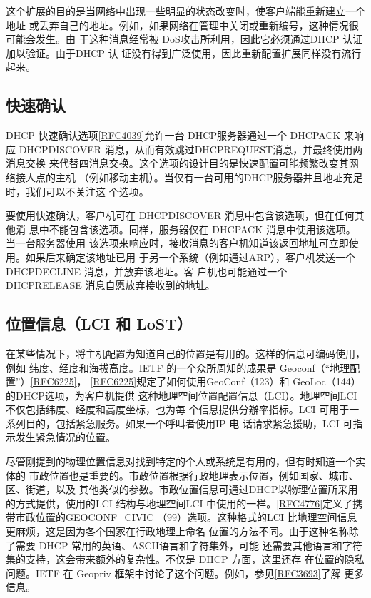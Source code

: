 这个扩展的目的是当网络中出现一些明显的状态改变时，使客户端能重新建立一个地址
或丢弃自己的地址。例如，如果网络在管理中关闭或重新编号，这种情况很可能会发生。由
于这种消息经常被 DoS攻击所利用，因此它必须通过DHCP 认证加以验证。由于DHCP 认
证没有得到广泛使用，因此重新配置扩展同样没有流行起来。

\subsection{快速确认}
DHCP
快速确认选项\href{https://www.rfc-editor.org/rfc/rfc4039}{\href{https://www.rfc-editor.org/rfc/rfc4039}{[RFC4039]}}允许一台
DHCP服务器通过一个 DHCPACK 来响应
DHCPDISCOVER 消息，从而有效跳过DHCPREQUEST消息，并最终使用两消息交换
来代替四消息交换。这个选项的设计目的是快速配置可能频繁改变其网络接人点的主机
（例如移动主机）。当仅有一台可用的DHCP服务器并且地址充足时，我们可以不关注这
个选项。

要使用快速确认，客户机可在 DHCPDISCOVER 消息中包含该选项，但在任何其他消
息中不能包含该选项。同样，服务器仅在 DHCPACK 消息中使用该选项。当一台服务器使用
该选项来响应时，接收消息的客户机知道该返回地址可立即使用。如果后来确定该地址已用
于另一个系统（例如通过ARP），客户机发送一个 DHCPDECLINE 消息，并放弃该地址。客
户机也可能通过一个 DHCPRELEASE 消息自愿放弃接收到的地址。

\subsection{位置信息（LCI 和 LoST）}

在某些情况下，将主机配置为知道自己的位置是有用的。这样的信息可编码使用，例如
纬度、经度和海拔高度。IETF 的一个众所周知的成果是
Geoconf（“地理配置”）\href{https://www.rfc-editor.org/rfc/rfc6225}{\href{https://www.rfc-editor.org/rfc/rfc6225}{[RFC6225]}}，
\href{https://www.rfc-editor.org/rfc/rfc6225}{\href{https://www.rfc-editor.org/rfc/rfc6225}{[RFC6225]}}规定了如何使用GeoConf（123）和
GeoLoc（144）的DHCP选项，为客户机提供
这种地理空间位置配置信息（LCI）。地理空间LCI 不仅包括纬度、经度和高度坐标，也为每
个信息提供分辦率指标。LCI 可用于一系列目的，包括紧急服务。如果一个呼叫者使用IP 电
话请求紧急援助，LCI 可指示发生紧急情况的位置。

尽管刚提到的物理位置信息对找到特定的个人或系统是有用的，但有时知道一个实体的
市政位置也是重要的。市政位置根据行政地理表示位置，例如国家、城市、区、街道，以及
其他类似的参数。市政位置信息可通过DHCP以物理位置所采用的方式提供，使用的LCI
结构与地理空间LCI
中使用的一样。\href{https://www.rfc-editor.org/rfc/rfc4776}{\href{https://www.rfc-editor.org/rfc/rfc4776}{[RFC4776]}}定义了携带市政位置的GEOCONF\_CIVIC
（99）选项。这种格式的LCI 比地理空间信息更麻烦，这是因为各个国家在行政地理上命名
位置的方法不同。由于这种名称除了需要 DHCP 常用的英语、ASCII语言和字符集外，可能
还需要其他语言和字符集的支持，这会带来额外的复杂性。不仅是 DHCP 方面，这里还存
在位置的隐私问题。IETF 在 Geopriv
框架中讨论了这个问题。例如，参见\href{https://www.rfc-editor.org/rfc/rfc3693}{\href{https://www.rfc-editor.org/rfc/rfc3693}{[RFC3693]}}了解
更多信息。

